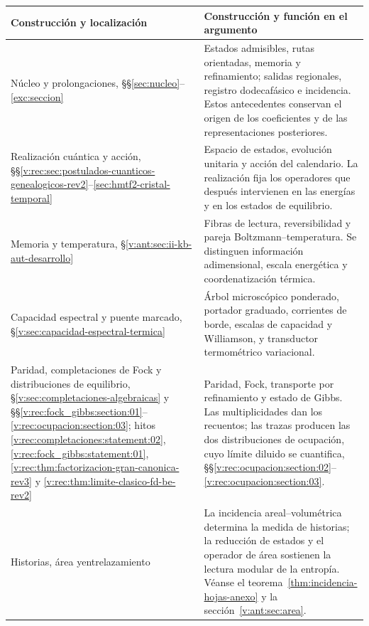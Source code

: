 \begin{table}[H]
\centering
\small
\renewcommand{\arraystretch}{1.2}
\begin{tabularx}{\textwidth}{@{}>{\raggedright\arraybackslash}p{}>{\raggedright\arraybackslash}X@{}}
\toprule
Construcción y localización & Construcción y función en el argumento \\
\midrule
Núcleo y prolongaciones, §§\ref{sec:nucleo}--\ref{exc:seccion}
& Estados admisibles, rutas orientadas, memoria y refinamiento; salidas
regionales, registro dodecafásico e incidencia. Estos antecedentes conservan
el origen de los coeficientes y de las representaciones posteriores. \\
Realización cuántica y acción,
§§\ref{v:rec:sec:postulados-cuanticos-genealogicos-rev2}--\ref{sec:hmtf2-cristal-temporal}
& Espacio de estados, evolución unitaria y acción del calendario. La
realización fija los operadores que después intervienen en las energías
y en los estados de equilibrio. \\
Memoria y temperatura,
§\ref{v:ant:sec:ii-kb-aut-desarrollo}
& Fibras de lectura, reversibilidad y pareja Boltzmann--temperatura.
Se distinguen información adimensional, escala energética y coordenatización térmica. \\
Capacidad espectral y puente marcado,
§\ref{v:sec:capacidad-espectral-termica}
& Árbol microscópico ponderado, portador graduado, corrientes de borde,
escalas de capacidad y Williamson, y transductor termométrico variacional. \\
Paridad, completaciones de Fock y distribuciones de equilibrio,
§\ref{v:sec:completaciones-algebraicas} y
§§\ref{v:rec:fock_gibbs:section:01}--\ref{v:rec:ocupacion:section:03};
hitos \ref{v:rec:completaciones:statement:02},
\ref{v:rec:fock_gibbs:statement:01},
\ref{v:rec:thm:factorizacion-gran-canonica-rev3} y
\ref{v:rec:thm:limite-clasico-fd-be-rev2}
& Paridad, Fock, transporte por refinamiento y estado de Gibbs.
Las multiplicidades dan los recuentos; las trazas producen las dos
distribuciones de ocupación, cuyo límite diluido se cuantifica, §§\ref{v:rec:ocupacion:section:02}--\ref{v:rec:ocupacion:section:03}. \\
Historias, área y\newline entrelazamiento
& La incidencia areal--volumétrica determina la medida de historias;
la reducción de estados y el operador de área sostienen la lectura
modular de la entropía. Véanse el teorema~\ref{thm:incidencia-hojas-anexo}
y la sección~\ref{v:ant:sec:area}. \\

\end{tabularx}
\end{table}
